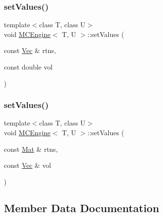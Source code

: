 \hypertarget{classMCEngine_a28f2f449e07eb22e0ae9caadfc919a3e}{}\label{classMCEngine_a28f2f449e07eb22e0ae9caadfc919a3e} 
\subsubsection{\texorpdfstring{set\+Values()}{setValues()}\hspace{0.1cm}{\footnotesize\ttfamily [1/2]}}
{\footnotesize\ttfamily template$<$class T, class U$>$ \\
void \hyperlink{classMCEngine}{M\+C\+Engine}$<$ T, U $>$\+::set\+Values (\begin{DoxyParamCaption}\item[{const \hyperlink{compute__returns__eigen_8h_a1eb6a9306ef406d7975f3cbf2e247777}{Vec} \&}]{rtns,  }\item[{const double}]{vol }\end{DoxyParamCaption})\hspace{0.3cm}{\ttfamily [inline]}}

\hypertarget{classMCEngine_ab95a4a68842966a18f2bc8ef74dabf1f}{}\label{classMCEngine_ab95a4a68842966a18f2bc8ef74dabf1f} 
\subsubsection{\texorpdfstring{set\+Values()}{setValues()}\hspace{0.1cm}{\footnotesize\ttfamily [2/2]}}
{\footnotesize\ttfamily template$<$class T, class U$>$ \\
void \hyperlink{classMCEngine}{M\+C\+Engine}$<$ T, U $>$\+::set\+Values (\begin{DoxyParamCaption}\item[{const \hyperlink{compute__returns__eigen_8h_ae14dd28696f743e067dbd2594616bad6}{Mat} \&}]{rtns,  }\item[{const \hyperlink{compute__returns__eigen_8h_a1eb6a9306ef406d7975f3cbf2e247777}{Vec} \&}]{vol }\end{DoxyParamCaption})\hspace{0.3cm}{\ttfamily [inline]}}



\subsection{Member Data Documentation}
\hypertarget{classMCEngine_a916324fa45d5e3288e5792fc769c1ded}{}\label{classMCEngine_a916324fa45d5e3288e5792fc769c1ded} 
